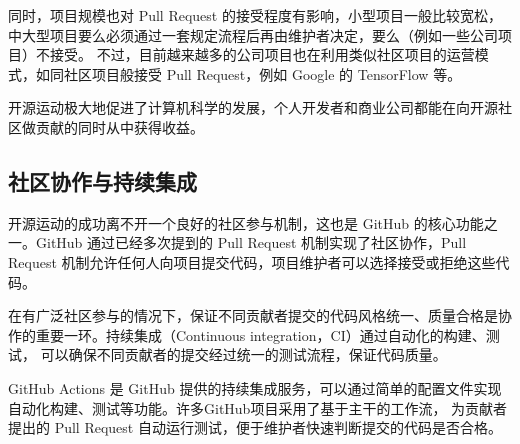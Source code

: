 \documentclass[../main.tex]{subfiles}
\begin{document}
同时，项目规模也对 Pull Request 的接受程度有影响，小型项目一般比较宽松，中大型项目要么必须通过一套规定流程后再由维护者决定，要么（例如一些公司项目）不接受。
不过，目前越来越多的公司项目也在利用类似社区项目的运营模式，如同社区项目般接受 Pull Request，例如 Google 的 TensorFlow 等。

开源运动极大地促进了计算机科学的发展，个人开发者和商业公司都能在向开源社区做贡献的同时从中获得收益。

\subsection{社区协作与持续集成}

开源运动的成功离不开一个良好的社区参与机制，这也是 GitHub 的核心功能之一。GitHub 通过已经多次提到的 Pull Request 机制实现了社区协作，Pull Request 机制允许任何人向项目提交代码，项目维护者可以选择接受或拒绝这些代码。

在有广泛社区参与的情况下，保证不同贡献者提交的代码风格统一、质量合格是协作的重要一环。持续集成（Continuous integration，CI）通过自动化的构建、测试，
可以确保不同贡献者的提交经过统一的测试流程，保证代码质量。

GitHub Actions 是 GitHub 提供的持续集成服务，可以通过简单的配置文件实现自动化构建、测试等功能。许多GitHub项目采用了基于主干的工作流，
为贡献者提出的 Pull Request 自动运行测试，便于维护者快速判断提交的代码是否合格。
\end{document}
